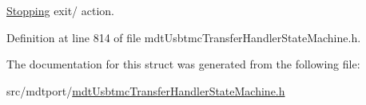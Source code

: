 \hyperlink{structmdt_usbtmc_transfer_handler_state_machine_1_1_state_machine___1_1_stopping}{Stopping} exit/ action. 



Definition at line 814 of file mdt\-Usbtmc\-Transfer\-Handler\-State\-Machine.\-h.



The documentation for this struct was generated from the following file\-:\begin{DoxyCompactItemize}
\item 
src/mdtport/\hyperlink{mdt_usbtmc_transfer_handler_state_machine_8h}{mdt\-Usbtmc\-Transfer\-Handler\-State\-Machine.\-h}\end{DoxyCompactItemize}
